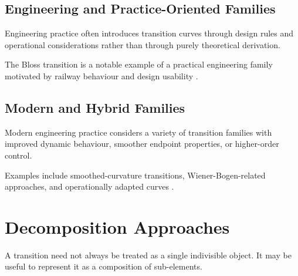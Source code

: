 \subsection{Engineering and Practice-Oriented Families}

\begin{remark}
Engineering practice often introduces transition curves through design
rules and operational considerations rather than through purely
theoretical derivation.
\end{remark}

\begin{remark}
The Bloss transition is a notable example of a practical engineering
family motivated by railway behaviour and design usability
\cite{Bloss1978TrackGeometry,Ciobanu2015Bloss}.
\end{remark}

\subsection{Modern and Hybrid Families}

\begin{remark}
Modern engineering practice considers a variety of transition families
with improved dynamic behaviour, smoother endpoint properties, or
higher-order control.
\end{remark}

\begin{remark}
Examples include smoothed-curvature transitions, Wiener-Bogen-related
approaches, and operationally adapted curves
\cite{Koc2017SmoothedEnds,Koc2019SmoothedTransition,Koc2019Operational,Wojtczak2017WienerBogen}.
\end{remark}


\section{Decomposition Approaches}

\begin{remark}
A transition need not always be treated as a single indivisible object.
It may be useful to represent it as a composition of sub-elements.
\end{remark}



